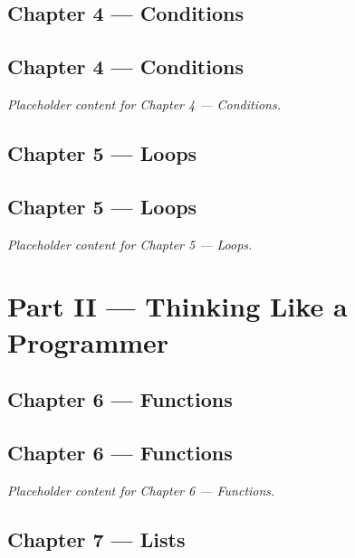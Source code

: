 \documentclass[
  letterpaper,
  DIV=11,
  numbers=noendperiod]{scrreprt}
\begin{document}
\chapter{Chapter 4 --- Conditions}\label{chapter-4-conditions}

\chapter*{Chapter 4 --- Conditions}\label{chapter-4-conditions-1}


\emph{Placeholder content for Chapter 4 --- Conditions.}

\chapter{Chapter 5 --- Loops}\label{chapter-5-loops}

\chapter*{Chapter 5 --- Loops}\label{chapter-5-loops-1}


\emph{Placeholder content for Chapter 5 --- Loops.}

\part{Part II --- Thinking Like a Programmer}

\chapter{Chapter 6 --- Functions}\label{chapter-6-functions}

\chapter*{Chapter 6 --- Functions}\label{chapter-6-functions-1}


\emph{Placeholder content for Chapter 6 --- Functions.}

\chapter{Chapter 7 --- Lists}\label{chapter-7-lists}
\end{document}
